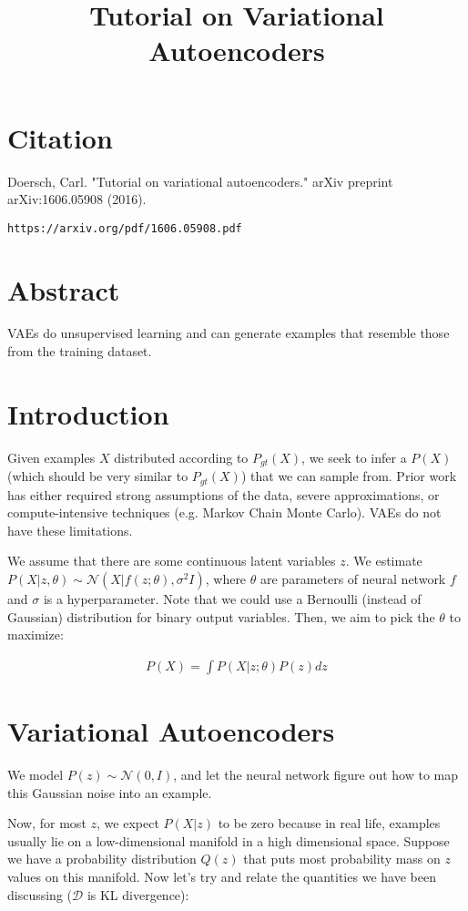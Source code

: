 \documentclass[a4paper]{article}
\title{Tutorial on Variational Autoencoders}
\date{}
\begin{document}
\maketitle

\section{Citation}
Doersch, Carl. "Tutorial on variational autoencoders." arXiv preprint arXiv:1606.05908 (2016).

\begin{verbatim}
https://arxiv.org/pdf/1606.05908.pdf
\end{verbatim}

\section{Abstract}
VAEs do unsupervised learning and can generate examples that resemble those from
the training dataset.

\section{Introduction}
Given examples $X$ distributed according to $P_{gt}(X)$, we seek to infer
a $P(X)$ (which should be very similar to $P_{gt}(X)$) that we can sample
from. Prior work has either required strong assumptions of the data, severe
approximations, or compute-intensive techniques (e.g. Markov Chain
Monte Carlo). VAEs do not have these limitations.

We assume that there are some continuous latent variables $z$. We estimate
$P(X|z, \theta) \sim \mathcal{N}(X | f(z; \theta), \sigma^2 I)$, where $\theta$
are parameters of neural network $f$ and $\sigma$ is a hyperparameter. Note
that we could use a Bernoulli (instead of Gaussian) distribution for binary
output variables. Then, we aim to pick the $\theta$ to maximize:

\begin{align}
P(X) = \int{P(X | z; \theta) P(z) dz}
\end{align}

\section{Variational Autoencoders}
We model $P(z) \sim \mathcal{N}(0, I)$, and let the neural network figure out
how to map this Gaussian noise into an example.

Now, for most $z$, we expect $P(X | z)$ to be zero because in real life,
examples usually lie on a low-dimensional manifold in a high dimensional space.
Suppose we have a probability distribution $Q(z)$ that puts most probability
mass on $z$ values on this manifold. Now let's try and relate the quantities
we have been discussing ($\mathcal{D}$ is KL divergence):
\end{document}
